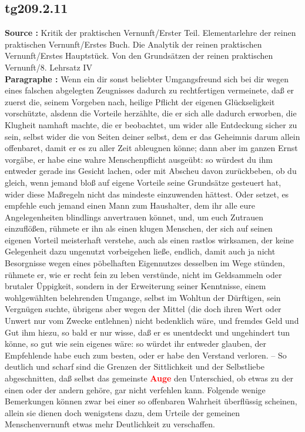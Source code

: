 \documentclass[a4paper,12pt,twoside]{book}
\newcommand{\match}[1]{\textcolor{red}{\textbf{#1}}}
\begin{document}
	\subsection*{tg209.2.11} 
	\textbf{Source : }Kritik der praktischen Vernunft/Erster Teil. Elementarlehre der reinen praktischen Vernunft/Erstes Buch. Die Analytik der reinen praktischen Vernunft/Erstes Hauptstück. Von den Grundsätzen der reinen praktischen Vernunft/8. Lehrsatz IV\\  
	
	\noindent\textbf{Paragraphe : }Wenn ein dir sonst beliebter Umgangsfreund sich bei dir wegen eines falschen abgelegten Zeugnisses dadurch zu rechtfertigen vermeinete, daß er zuerst die, seinem Vorgeben nach, heilige Pflicht der eigenen Glückseligkeit vorschützte, alsdenn die Vorteile herzählte, die er sich alle dadurch erworben, die Klugheit namhaft machte, die er beobachtet, um wider alle Entdeckung sicher zu sein, selbst wider die von Seiten deiner selbst, dem er das Geheimnis darum allein offenbaret, damit er es zu aller Zeit ableugnen könne; dann aber im ganzen Ernst vorgäbe, er habe eine wahre Menschenpflicht ausgeübt: so würdest du ihm entweder gerade ins Gesicht lachen, oder mit Abscheu davon zurückbeben, ob du gleich, wenn jemand bloß auf eigene Vorteile seine Grundsätze gesteuert hat, wider diese Maßregeln nicht das mindeste einzuwenden hättest. Oder setzet, es empfehle euch jemand einen Mann zum Haushalter, dem ihr alle eure Angelegenheiten blindlings anvertrauen könnet, und, um euch Zutrauen einzuflößen, rühmete er ihn als einen klugen Menschen, der sich auf seinen eigenen Vorteil meisterhaft verstehe, auch als einen rastlos wirksamen, der keine Gelegenheit dazu ungenutzt vorbeigehen ließe, endlich, damit auch ja nicht Besorgnisse wegen eines pöbelhaften Eigennutzes desselben im Wege stünden, rühmete er, wie er recht fein zu leben verstünde, nicht im Geldsammeln oder brutaler Üppigkeit, sondern in der Erweiterung seiner Kenntnisse, einem wohlgewählten belehrenden Umgange, selbst im Wohltun der Dürftigen, sein Vergnügen suchte, übrigens aber wegen der Mittel (die doch ihren Wert oder Unwert nur vom Zwecke entlehnen) nicht bedenklich wäre, und fremdes Geld und Gut ihm hiezu, so bald er nur wisse,  daß er es unentdeckt und ungehindert tun könne, so gut wie sein eigenes wäre: so würdet ihr entweder glauben, der Empfehlende habe euch zum besten, oder er habe den Verstand verloren. – So deutlich und scharf sind die Grenzen der Sittlichkeit und der Selbstliebe abgeschnitten, daß selbst das gemeinste \match{Auge} den Unterschied, ob etwas zu der einen oder der andern gehöre, gar nicht verfehlen kann. Folgende wenige Bemerkungen können zwar bei einer so offenbaren Wahrheit überflüssig scheinen, allein sie dienen doch wenigstens dazu, dem Urteile der gemeinen Menschenvernunft etwas mehr Deutlichkeit zu verschaffen. 
	
\end{document}

